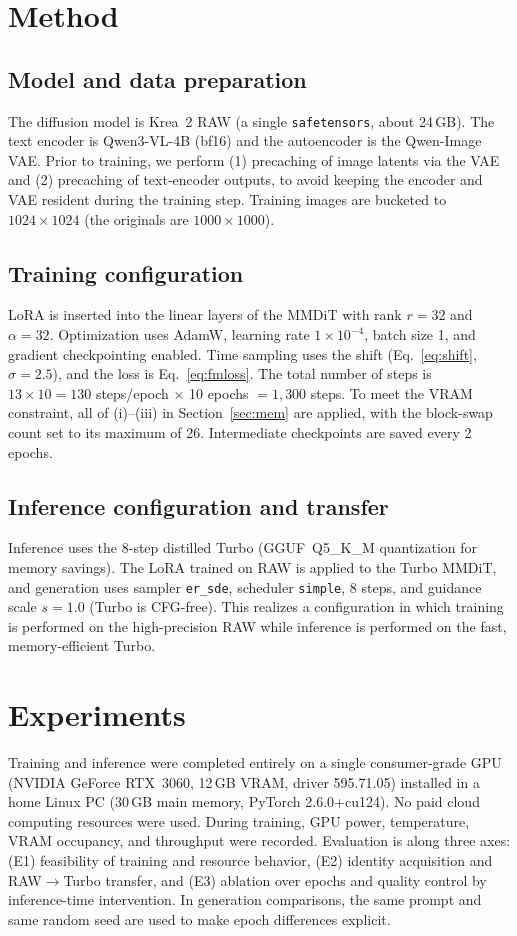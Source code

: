 \documentclass[10pt,twocolumn]{article}
\begin{document}
\section{Method}
\subsection{Model and data preparation}
The diffusion model is Krea~2 RAW (a single \texttt{safetensors}, about 24\,GB). The text encoder is Qwen3-VL-4B (bf16) and the autoencoder is the Qwen-Image VAE. Prior to training, we perform (1) precaching of image latents via the VAE and (2) precaching of text-encoder outputs, to avoid keeping the encoder and VAE resident during the training step. Training images are bucketed to $1024\times1024$ (the originals are $1000\times1000$).

\subsection{Training configuration}
LoRA is inserted into the linear layers of the MMDiT with rank $r=32$ and $\alpha=32$. Optimization uses AdamW, learning rate $1\times10^{-4}$, batch size 1, and gradient checkpointing enabled. Time sampling uses the shift (Eq.~\eqref{eq:shift}, $\sigma=2.5$), and the loss is Eq.~\eqref{eq:fmloss}. The total number of steps is $13\times10=130$ steps/epoch $\times$ 10 epochs $=1{,}300$ steps. To meet the VRAM constraint, all of (i)--(iii) in Section~\ref{sec:mem} are applied, with the block-swap count set to its maximum of 26. Intermediate checkpoints are saved every 2 epochs.

\subsection{Inference configuration and transfer}
Inference uses the 8-step distilled Turbo (GGUF~Q5\_K\_M quantization for memory savings). The LoRA trained on RAW is applied to the Turbo MMDiT, and generation uses sampler \texttt{er\_sde}, scheduler \texttt{simple}, 8 steps, and guidance scale $s=1.0$ (Turbo is CFG-free). This realizes a configuration in which training is performed on the high-precision RAW while inference is performed on the fast, memory-efficient Turbo.

\section{Experiments}
Training and inference were completed entirely on a single consumer-grade GPU (NVIDIA GeForce RTX~3060, 12\,GB VRAM, driver 595.71.05) installed in a home Linux PC (30\,GB main memory, PyTorch 2.6.0+cu124). No paid cloud computing resources were used. During training, GPU power, temperature, VRAM occupancy, and throughput were recorded. Evaluation is along three axes: (E1) feasibility of training and resource behavior, (E2) identity acquisition and RAW$\to$Turbo transfer, and (E3) ablation over epochs and quality control by inference-time intervention. In generation comparisons, the same prompt and same random seed are used to make epoch differences explicit.
\end{document}
